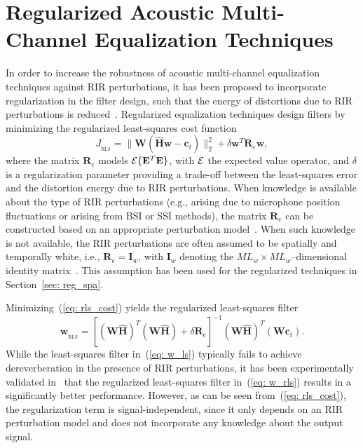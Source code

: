 \documentclass[10pt]{IEEEtran}
\begin{document}
\section{Regularized Acoustic Multi-Channel Equalization Techniques}
\label{sec: reg}
In order to increase the robustness of acoustic multi-channel equalization techniques against RIR perturbations, it has been proposed to incorporate regularization in the filter design, such that the energy of distortions due to RIR perturbations is reduced~\cite{Hikichi_EURASIP_2007,Kodrasi_ITASLP_2013}.
Regularized equalization techniques design filters by minimizing the regularized least-squares cost function
\begin{equation}
\label{eq: rls_cost}
\boxed{J_{_{\text{RLS}}} = \|\mathbf{W}(\hat{\mathbf{H}}\mathbf{w} - \mathbf{c}_t) \|_2^2 + \delta \mathbf{w}^T\mathbf{R}_e\mathbf{w},}
\end{equation}
where the matrix $\mathbf{R}_e$ models ${\cal{E}} \{\mathbf{E}^T\mathbf{E}\}$, with ${\cal{E}}$ the expected value operator, and $\delta$ is a regularization parameter providing a trade-off between the least-squares error and the distortion energy due to RIR perturbations.
When knowledge is available about the type of RIR perturbations (e.g., arising due to microphone position fluctuations or arising from BSI or SSI methods), the matrix $\mathbf{R}_e$ can be constructed based on an appropriate perturbation model~\cite{Jungmann_ITASLP_2012, Lim_IWAENC_2014}.
When such knowledge is not available, the RIR perturbations are often assumed to be spatially and temporally white, i.e., $\mathbf{R}_e = \mathbf{I}_w$, with $\mathbf{I}_w$ denoting the $ML_w \times ML_w$--dimensional identity matrix~\cite{Hikichi_EURASIP_2007,Kodrasi_ITASLP_2013}.
This assumption has been used for the regularized techniques in Section~\ref{sec: reg_spa}.

Minimizing~(\ref{eq: rls_cost}) yields the regularized least-squares filter
\begin{equation}
\label{eq: w_rls}
\mathbf{w}_{_{\text{RLS}}} = [ (\mathbf{W}\hat{\mathbf{H}})^T(\mathbf{W}\hat{\mathbf{H}}) + \delta \mathbf{R}_{e} ]^{-1}(\mathbf{W}\hat{\mathbf{H}})^T(\mathbf{W}\mathbf{c}_t).
\end{equation}
While the least-squares filter in~(\ref{eq: w_ls}) typically fails to achieve dereverberation in the presence of RIR perturbations, it has been experimentally validated in~\cite{Kodrasi_ITASLP_2013} that the regularized least-squares filter in~(\ref{eq: w_rls}) results in a significantly better performance.
However, as can be seen from~(\ref{eq: rls_cost}), the regularization term is signal-independent, since it only depends on an RIR perturbation model and does not incorporate any knowledge about the output signal.
\end{document}
